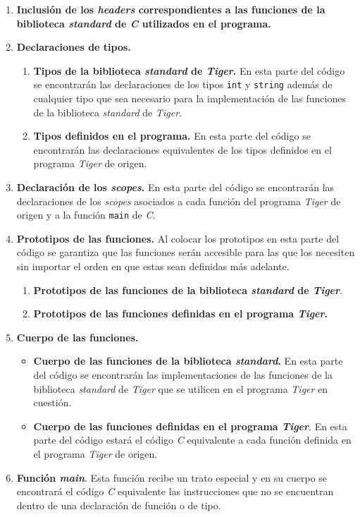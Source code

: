 \documentclass{article}
\begin{document}
\begin{enumerate}
    \item \textbf{Inclusión de los \emph{headers} correspondientes a las
    funciones de la biblioteca \emph{standard} de \emph{C} utilizados en el
    programa.}

    \item \textbf{Declaraciones de tipos.}
    \begin{enumerate}
        \item \textbf{Tipos de la biblioteca \emph{standard} de \emph{Tiger}.}
        En esta parte del código se encontrarán las declaraciones de los tipos
        \texttt{int} y \texttt{string} además de cualquier tipo que sea
        necesario para la implementación de las funciones de la biblioteca
        \emph{standard} de \emph{Tiger}.

  		\item \textbf{Tipos definidos en el programa.} En esta parte del código se
  		encontrarán las declaraciones equivalentes de los tipos definidos en el
  		programa \emph{Tiger} de origen.
    \end{enumerate}

  	\item \textbf{Declaración de los \textit{scopes}.} En esta parte del código
  	se encontrarán las declaraciones de los \emph{scopes} asociados a cada función
  	del programa \textit{Tiger} de origen y a la función \texttt{main} de
  	\emph{C}.

  	\item \textbf{Prototipos de las funciones.} Al colocar los prototipos en
  	esta parte del código se garantiza que las funciones serán accesible para
  	las que los necesiten sin importar el orden en que estas sean definidas más
  	adelante.
    \begin{enumerate}
        \item \textbf{Prototipos de las funciones de la biblioteca
        \emph{standard} de \emph{Tiger}}.
        \item \textbf{Prototipos de las funciones definidas en el programa
        \emph{Tiger}.}
    \end{enumerate}

    \item \textbf{Cuerpo de las funciones.}
    \begin{itemize}
        \item \textbf{Cuerpo de las funciones de la biblioteca \emph{standard}.}
        En esta parte del código se encontrarán las implementaciones de las
        funciones de la biblioteca \emph{standard} de \textit{Tiger} que se
        utilicen en el programa \emph{Tiger} en cuestión.
        \item \textbf{Cuerpo de las funciones definidas en el programa
        \emph{Tiger}}. En esta parte del código estará el código \textit{C}
        equivalente a cada función definida en el programa \textit{Tiger} de
        origen.
    \end{itemize}

    \item \textbf{Función \textit{main}}. Esta función recibe un trato especial
    y en su cuerpo se encontrará el código \textit{C} equivalente las
    instrucciones que no se encuentran dentro de una declaración de función o
    de tipo.
\end{enumerate}
\end{document}
